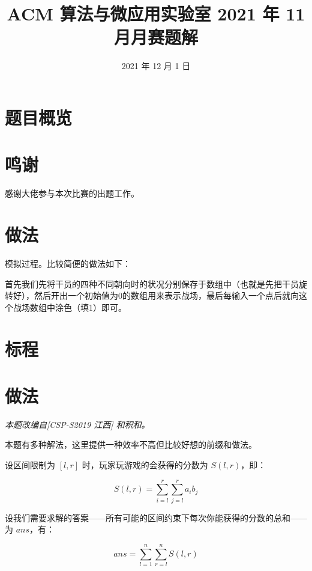 \documentclass{../cpct/ctsol}
\title{ACM 算法与微应用实验室 2021 年 11 月月赛题解}
\date{2021 年 12 月 1 日}
\begin{document}
\maketitle
{}

\section*{题目概览}
\solutiontab

\section*{鸣谢}

感谢\href{https://github.com/Tiphereth-A}{\@Tifa}大佬参与本次比赛的出题工作。

\makesolution
\section*{做法}

模拟过程。比较简便的做法如下：

首先我们先将干员的四种不同朝向时的状况分别保存于数组中（也就是先把干员旋转好），然后开出一个初始值为0的数组用来表示战场，最后每输入一个点后就向这个战场数组中涂色（填1）即可。

\section*{标程}


\makesolution
\section*{做法}

\emph{本题改编自[CSP-S2019 江西] 和积和。}

本题有多种解法，这里提供一种效率不高但比较好想的前缀和做法。

设区间限制为 $[l,r]$ 时，玩家玩游戏的会获得的分数为 $S(l,r)$，即：

$$S(l,r) = \sum_{i=l}^r \sum_{j=l}^r a_i b_j$$

设我们需要求解的答案——所有可能的区间约束下每次你能获得的分数的总和——为 $ans$，有：

$$ans = \sum_{l=1}^n \sum_{r=l}^n S(l,r)$$
\end{document}
